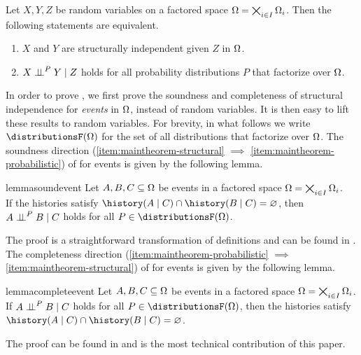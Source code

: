 \documentclass[USenglish,onecolumn]{article}
\begin{document}
\begin{theorem}\label{thrm:soundcomplete}%
Let $X,Y,Z$ be random variables on a factored space $\Omega=\bigtimes_{i\in I}\Omega_i$. Then the following statements are equivalent.
\begin{enumerate}[label=(\roman*),leftmargin=*]
    \item\label{item:maintheorem-structural} $X$ and $Y$ are structurally independent given $Z$ in $\Omega$.
    \item\label{item:maintheorem-probabilistic} $X \mathrel{\perp\!\!\!\perp}^P Y \mid Z$ holds for all probability distributions $P$ that factorize over $\Omega$.
\end{enumerate}
\end{theorem}
In order to prove , we first prove the soundness and completeness of structural independence for \emph{events} in $\Omega$, instead of random variables.
It is then easy to lift these results to random variables.
For brevity, in what follows we write $\distributionsF(\Omg)$ for the set of all distributions that factorize over $\Omega$.
The soundness direction (\ref{item:maintheorem-structural} $\implies$ \ref{item:maintheorem-probabilistic}) of  for events is given by the following lemma.
\begin{restatable}{lemma}{soundevent}%
  \label{lemma:soundevent}%
  Let $A,B,C\subseteq \Omega$ be events in a factored space $\Omega=\bigtimes_{i\in I}\Omega_i$.\\
    If the histories satisfy
    $\history(A\given C)\cap \history(B\given C)=\nothing$,
    then $A \mathrel{\perp\!\!\!\perp}^P B \mid C$ holds for all $P\in\distributionsF(\Omg)$.
\end{restatable}
\noindent The proof is a straightforward transformation of definitions and can be found in .
The completeness direction (\ref{item:maintheorem-probabilistic} $\implies$ \ref{item:maintheorem-structural}) of  for events is given by the following lemma.
\begin{restatable}{lemma}{completeevent}%
  \label{lemma:completeevent}%
  Let $A,B,C\subseteq \Omega$ be events in a factored space $\Omega=\bigtimes_{i\in I}\Omega_i$.\\
  If $A \mathrel{\perp\!\!\!\perp}^P B \mid C$ holds for all $P\in\distributionsF(\Omg)$, then the histories satisfy $\history(A\given C)\cap \history(B\given C)=\nothing$.
\end{restatable}
\noindent The proof can be found in  and is the most technical contribution of this paper.
\end{document}
